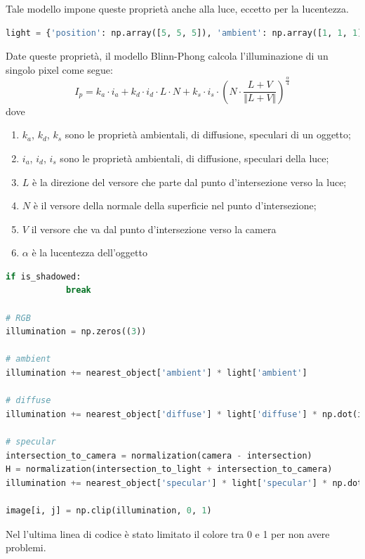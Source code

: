 \documentclass[9pt,a4paper,twoside]{tau}
\begin{document}
Tale modello impone queste proprietà anche alla luce, eccetto per la lucentezza.
\begin{lstlisting}[language=Python]
light = {'position': np.array([5, 5, 5]), 'ambient': np.array([1, 1, 1]), 'diffuse': np.array([1, 1, 1]), 'specular':np.array[1, 1, 1]}
\end{lstlisting}
Date queste proprietà, il modello Blinn-Phong calcola l'illuminazione di un singolo pixel come segue:
\begin{equation*}
	I_p = k_a \cdot i_a + k_d \cdot i_d \cdot L \cdot N + k_s \cdot i_s \cdot \left( N \cdot \frac{L+V}{\Vert L + V \Vert} \right)^{\frac{\alpha}{4}}
\end{equation*}
dove
\begin{enumerate}
	\item $k_a$, $k_d$, $k_s$ sono le proprietà ambientali, di diffusione, speculari di un oggetto;
	\item $i_a$, $i_d$, $i_s$ sono le proprietà ambientali, di diffusione, speculari della luce;
	\item $L$ è la direzione del versore che parte dal punto d'intersezione verso la luce;
	\item $N$ è il versore della normale della superficie nel punto d'intersezione;
	\item $V$ il versore che va dal punto d'intersezione verso la camera
	\item $\alpha$ è la lucentezza dell'oggetto
\end{enumerate}

\begin{lstlisting}[language=Python]
if is_shadowed:
            break

# RGB
illumination = np.zeros((3))

# ambient
illumination += nearest_object['ambient'] * light['ambient']

# diffuse
illumination += nearest_object['diffuse'] * light['diffuse'] * np.dot(intersection_to_light, normal_to_surface)

# specular
intersection_to_camera = normalization(camera - intersection)
H = normalization(intersection_to_light + intersection_to_camera)
illumination += nearest_object['specular'] * light['specular'] * np.dot(normal_to_surface, H) ** (nearest_object['shininess']/4)

image[i, j] = np.clip(illumination, 0, 1) 
\end{lstlisting}
Nel l'ultima linea di codice è stato limitato il colore tra 0 e 1 per non avere problemi.





					

\nocite{*}
\printbibliography

\end{document}
